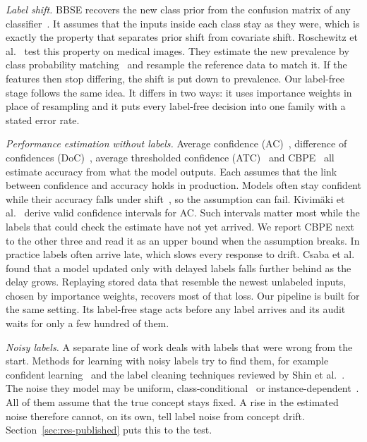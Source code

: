 \documentclass[pdflatex,referee,lineno,sn-basic]{sn-jnl}
\begin{document}
\emph{Label shift.} BBSE recovers the new class prior from the confusion matrix of any classifier~\citep{lipton2018bbse}. It assumes that the inputs inside each class stay as they were, which is exactly the property that separates prior shift from covariate shift. Roschewitz et al.~\citeyearpar{roschewitz2025shiftid} test this property on medical images. They estimate the new prevalence by class probability matching~\citep{wen2024cpmcn} and resample the reference data to match it. If the features then stop differing, the shift is put down to prevalence. Our label-free stage follows the same idea. It differs in two ways: it uses importance weights in place of resampling and it puts every label-free decision into one family with a stated error rate.

\emph{Performance estimation without labels.} Average confidence (AC)~\citep{hendrycks2017baseline}, difference of confidences (DoC)~\citep{guillory2021predicting}, average thresholded confidence (ATC)~\citep{garg2022atc} and CBPE~\citep{kivimaki2025performance} all estimate accuracy from what the model outputs. Each assumes that the link between confidence and accuracy holds in production. Models often stay confident while their accuracy falls under shift~\citep{ovadia2019trust}, so the assumption can fail. Kivimäki et al.~\citeyearpar{kivimaki2025confidence} derive valid confidence intervals for AC. Such intervals matter most while the labels that could check the estimate have not yet arrived. We report CBPE next to the other three and read it as an upper bound when the assumption breaks. In practice labels often arrive late, which slows every response to drift. Csaba et al.~\citeyearpar{csaba2024labeldelay} found that a model updated only with delayed labels falls further behind as the delay grows. Replaying stored data that resemble the newest unlabeled inputs, chosen by importance weights, recovers most of that loss. Our pipeline is built for the same setting. Its label-free stage acts before any label arrives and its audit waits for only a few hundred of them.

\emph{Noisy labels.} A separate line of work deals with labels that were wrong from the start. Methods for learning with noisy labels try to find them, for example confident learning~\citep{northcutt2021confident} and the label cleaning techniques reviewed by Shin et al.~\citeyearpar{shin2024labelcleaning}. The noise they model may be uniform, class-conditional~\citep{natarajan2013noisy} or instance-dependent~\citep{chen2021instance}. All of them assume that the true concept stays fixed. A rise in the estimated noise therefore cannot, on its own, tell label noise from concept drift. Section~\ref{sec:res-published} puts this to the test.
\end{document}
